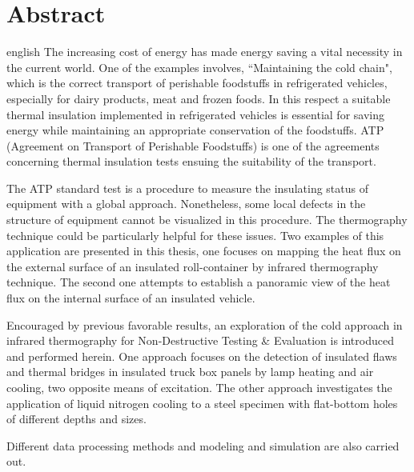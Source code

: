 \chapter*{Abstract}                      %

\begin{otherlanguage*}{english}
   The increasing cost of energy has made energy saving a vital necessity in the current world. One of the examples involves, ``Maintaining the cold chain", which is the correct transport of perishable foodstuffs in refrigerated vehicles, especially for dairy products, meat and frozen foods.  In this respect a suitable thermal insulation implemented in refrigerated vehicles is essential for saving energy while maintaining an appropriate conservation of the foodstuffs. ATP (Agreement on Transport of Perishable Foodstuffs) is one of the agreements concerning thermal insulation tests ensuing the suitability of the transport.
   
   The ATP standard test is a procedure to measure the insulating status of equipment with a global approach. Nonetheless, some local defects in the structure of equipment cannot be visualized in this procedure. The thermography technique could be particularly helpful for these issues. Two examples of this application are presented in this thesis, one focuses on mapping the heat flux on the external surface of an insulated roll-container by infrared thermography technique. The second one attempts to establish a panoramic view of the heat flux on the internal surface of an insulated vehicle. 
   
   Encouraged by previous favorable results, an exploration of the cold approach in infrared thermography for Non-Destructive Testing \& Evaluation is introduced and performed herein. One approach focuses on the detection of insulated flaws and thermal bridges in insulated truck box panels by lamp heating and air cooling, two opposite means of excitation. The other approach investigates the application of  liquid nitrogen cooling to a steel specimen with flat-bottom holes of different depths and sizes.
   
   Different data processing methods and modeling and simulation are also carried out.%
\end{otherlanguage*}
